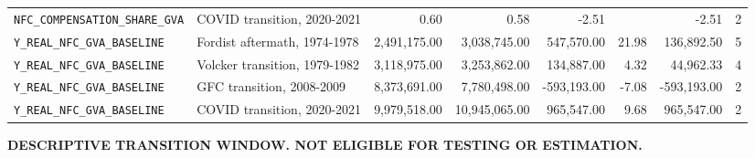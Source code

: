 \begin{landscape}
\begin{longtable}{p{3.4cm}p{3.2cm}rrrrrr}
\\
\nolinkurl{NFC_COMPENSATION_SHARE_GVA} & COVID transition, 2020-2021 & 0.60 & 0.58 & -2.51 &  & -2.51 & 2
\\
\nolinkurl{Y_REAL_NFC_GVA_BASELINE} & Fordist aftermath, 1974-1978 & 2,491,175.00 & 3,038,745.00 & 547,570.00 & 21.98 & 136,892.50 & 5
\\
\nolinkurl{Y_REAL_NFC_GVA_BASELINE} & Volcker transition, 1979-1982 & 3,118,975.00 & 3,253,862.00 & 134,887.00 & 4.32 & 44,962.33 & 4
\\
\nolinkurl{Y_REAL_NFC_GVA_BASELINE} & GFC transition, 2008-2009 & 8,373,691.00 & 7,780,498.00 & -593,193.00 & -7.08 & -593,193.00 & 2
\\
\nolinkurl{Y_REAL_NFC_GVA_BASELINE} & COVID transition, 2020-2021 & 9,979,518.00 & 10,945,065.00 & 965,547.00 & 9.68 & 965,547.00 & 2
\\
\bottomrule
\end{longtable}
\noindent\textbf{DESCRIPTIVE TRANSITION WINDOW. NOT ELIGIBLE FOR TESTING OR ESTIMATION.}
\end{landscape}
